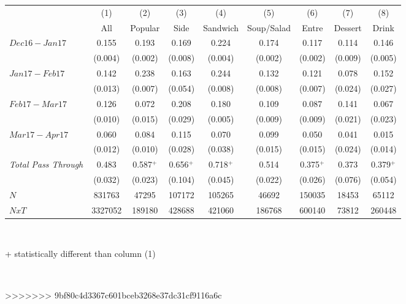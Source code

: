\begin{center}
\begin{tabular}{lcccccccc}
\hline  & (1) & (2) & (3) & (4) & (5) & (6) & (7) & (8)\\
 & All & Popular & Side & Sandwich & Soup/Salad & Entre & Dessert & Drink\\
\hline  $ Dec16-Jan17 $  & 0.155 & 0.193 & 0.169 & 0.224 & 0.174 & 0.117 & 0.114 & 0.146\\
 & (0.004) & (0.002) & (0.008) & (0.004) & (0.002) & (0.002) & (0.009) & (0.005)\\
 $ Jan17-Feb17 $  & 0.142 & 0.238 & 0.163 & 0.244 & 0.132 & 0.121 & 0.078 & 0.152\\
 & (0.013) & (0.007) & (0.054) & (0.008) & (0.008) & (0.007) & (0.024) & (0.027)\\
 $ Feb17-Mar17 $  & 0.126 & 0.072 & 0.208 & 0.180 & 0.109 & 0.087 & 0.141 & 0.067\\
 & (0.010) & (0.015) & (0.029) & (0.005) & (0.009) & (0.009) & (0.021) & (0.023)\\
 $ Mar17-Apr17 $  & 0.060 & 0.084 & 0.115 & 0.070 & 0.099 & 0.050 & 0.041 & 0.015\\
 & (0.012) & (0.010) & (0.028) & (0.038) & (0.015) & (0.015) & (0.024) & (0.014)\\
\hline \textit{Total Pass Through} & 0.483 & 0.587$^+$ & 0.656$^+$ & 0.718$^+$ & 0.514 & 0.375$^+$ & 0.373 & 0.379$^+$\\
  & (0.032) & (0.023) & (0.104) & (0.045) & (0.022) & (0.026) & (0.076) & (0.054)\\
\hline  $ N $  & 831763 & 47295 & 107172 & 105265 & 46692 & 150035 & 18453 & 65112\\
 $ NxT $  & 3327052 & 189180 & 428688 & 421060 & 186768 & 600140 & 73812 & 260448\\
\hline\end{tabular}\\
\begin{tiny} + statistically different than column (1)\end{tiny}\\
\end{center}
>>>>>>> 9bf80c4d3367c601bceb3268e37dc31cf9116a6c
